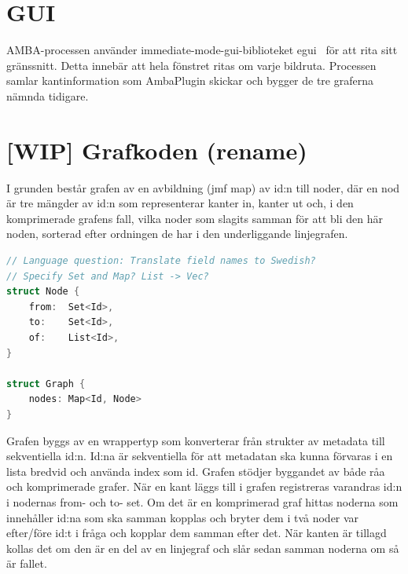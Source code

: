 
\section{GUI}
AMBA-processen använder immediate-mode-gui-biblioteket egui~\cite{egui}
för att rita sitt gränssnitt. Detta innebär att hela fönstret ritas om
varje bildruta. Processen samlar kantinformation som AmbaPlugin
skickar och bygger de tre graferna nämnda tidigare.

\section{[WIP] Grafkoden (rename)}
I grunden består grafen av en avbildning (jmf map) av id:n till noder,
där en nod är tre mängder av id:n som representerar kanter in, kanter
ut och, i den komprimerade grafens fall, vilka noder som slagits
samman för att bli den här noden, sorterad efter ordningen de har i
den underliggande linjegrafen.

\begin{lstlisting}[label={list:third}, language=Swift]
// Language question: Translate field names to Swedish?
// Specify Set and Map? List -> Vec?
struct Node {
    from:  Set<Id>,
    to:    Set<Id>,
    of:    List<Id>,
}

struct Graph {
    nodes: Map<Id, Node>
}
\end{lstlisting}

Grafen byggs av en wrappertyp som konverterar från strukter av
metadata till sekventiella id:n. Id:na är sekventiella för att
metadatan ska kunna förvaras i en lista bredvid och använda index som
id. Grafen stödjer byggandet av både råa och komprimerade grafer. När
en kant läggs till i grafen registreras varandras id:n i nodernas
from- och to- set. Om det är en komprimerad graf hittas noderna som
innehåller id:na som ska samman kopplas och bryter dem i två noder var
efter/före id:t i fråga och kopplar dem samman efter det. När kanten
är tillagd kollas det om den är en del av en linjegraf och slår sedan
samman noderna om så är fallet.

